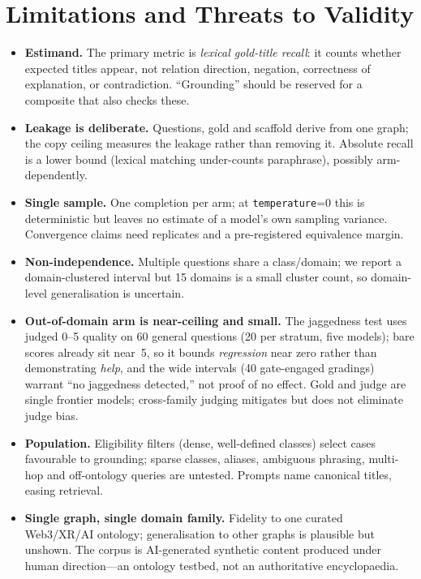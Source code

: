 \documentclass[11pt]{article}
\begin{document}
\section{Limitations and Threats to Validity}\label{sec:limits}
\begin{itemize}[topsep=2pt,itemsep=1pt]
\item \textbf{Estimand.} The primary metric is \emph{lexical gold-title recall}: it counts whether
expected titles appear, not relation direction, negation, correctness of explanation, or
contradiction. ``Grounding'' should be reserved for a composite that also checks these.
\item \textbf{Leakage is deliberate.} Questions, gold and scaffold derive from one graph; the copy
ceiling measures the leakage rather than removing it. Absolute recall is a lower bound (lexical
matching under-counts paraphrase), possibly arm-dependently.
\item \textbf{Single sample.} One completion per arm; at \texttt{temperature}=0 this is
deterministic but leaves no estimate of a model's own sampling variance. Convergence claims need
replicates and a pre-registered equivalence margin.
\item \textbf{Non-independence.} Multiple questions share a class/domain; we report a
domain-clustered interval but 15 domains is a small cluster count, so domain-level generalisation
is uncertain.
\item \textbf{Out-of-domain arm is near-ceiling and small.} The jaggedness test uses judged 0--5
quality on 60 general questions (20 per stratum, five models); bare scores already sit near~5, so it
bounds \emph{regression} near zero rather than demonstrating \emph{help}, and the wide intervals
(40 gate-engaged gradings) warrant ``no jaggedness detected,'' not proof of no effect. Gold and
judge are single frontier models; cross-family judging mitigates but does not eliminate judge bias.
\item \textbf{Population.} Eligibility filters (dense, well-defined classes) select cases
favourable to grounding; sparse classes, aliases, ambiguous phrasing, multi-hop and off-ontology
queries are untested. Prompts name canonical titles, easing retrieval.
\item \textbf{Single graph, single domain family.} Fidelity to one curated Web3/XR/AI ontology;
generalisation to other graphs is plausible but unshown. The corpus is AI-generated synthetic
content produced under human direction---an ontology testbed, not an authoritative encyclopaedia.
\end{itemize}
\end{document}
